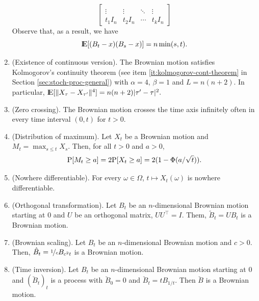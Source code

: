 \documentclass[a4paper,10pt]{scrbook}
\begin{document}
\begin{enumerate}
\[\begin{bmatrix}
                                 \\
                                 \vdots & \vdots & \ddots & \vdots
                                 \\
                                 t_1 I_n & t_2 I_n & \cdots & t_k I_n 
                                \end{bmatrix}
        \]
	Observe that, as a result, we have
	\[
	 \E[(B_t - x)(B_s - x)] = n \min(s,t).
	\]
 \item (Existence of continuous version). The Brownian motion satisfies Kolmogorov's continuity theorem 
       (see item \ref{it:kolmogorov-cont-theorem} in Section \ref{sec:stoch-proc-general}) with \(\alpha = 4\), 
       \(\beta = 1\) and \(L = n(n+2)\). In particular, 
       \(
	      \E[\|X_{\tau} - X_{\tau'}\|^4] 
	{}={} 
	      n(n+2) |\tau' - \tau|^2.
	\)
 \item (Zero crossing). The Brownian motion crosses the time axis infinitely often in every time interval
       \((0, t)\) for \(t>0\).
       
 \item (Distribution of maximum). Let \(X_t\) be a Brownian motion and \(M_t = \max_{s \leq t} X_s\).
       Then, for all \(t>0\) and \(a>0\),
       \[
        \mathrm{P}[M_t \geq a] = 2\mathrm{P}[X_t \geq a] = 2(1-\Phi(a/\sqrt{t})).
       \]

 \item (Nowhere differentiable). For every \(\omega\in\Omega\), \(t\mapsto X_t(\omega)\) is 
        nowhere differentiable.
 \item (Orthogonal transformation). Let \(B_t\) be an \(n\)-dimensional Brownian motion starting at \(0\) and 
       \(U\) be an orthogonal matrix, \(UU^{\top} = I\). Them,
       \(\tilde{B}_t = UB_t\) is a Brownian motion.
 \item (Brownian scaling).   Let \(B_t\) be an \(n\)-dimensional Brownian motion and \(c>0\).
       Then, \(\hat{B}_t = \nicefrac{1}{c}B_{c^2 t}\) is a Brownian motion.       
 \item (Time inversion). Let \(B_t\) be an \(n\)-dimensional Brownian motion starting at \(0\) and 
       \((\breve{B}_t)_t\) is a process with \(\breve{B}_0 = 0\) and \(\breve{B}_t = t B_{1/t}\).
       Then \(\breve{B}\) is a Brownian motion.
\end{enumerate}
\end{document}
